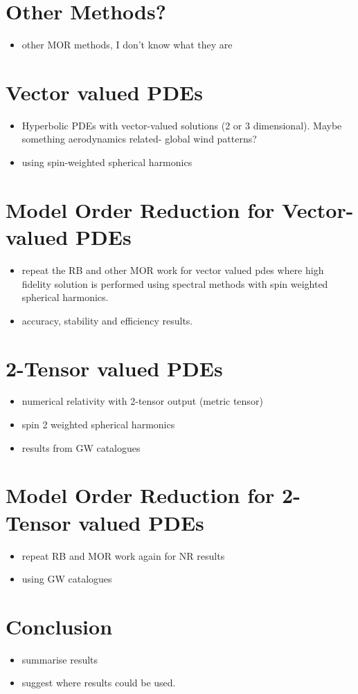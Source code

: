 \chapter{Other Methods?}
\begin{itemize}
\item other MOR methods, I don't know what they are
\end{itemize}

\chapter{Vector valued PDEs}
\begin{itemize}
\item Hyperbolic PDEs with vector-valued solutions (2 or 3 dimensional). Maybe something aerodynamics related- global wind patterns?
\item using spin-weighted spherical harmonics
\end{itemize}

\chapter{Model Order Reduction for Vector-valued PDEs}
\begin{itemize}
\item repeat the RB and other MOR work for vector valued pdes where high fidelity solution is performed using spectral methods with spin weighted spherical harmonics.
\item accuracy, stability and efficiency results.
\end{itemize}

\chapter{2-Tensor valued PDEs}
\begin{itemize}
\item numerical relativity with 2-tensor output (metric tensor)
\item spin 2 weighted spherical harmonics
\item results from GW catalogues
\end{itemize}

\chapter{Model Order Reduction for 2-Tensor valued PDEs}
\begin{itemize}
\item repeat RB and MOR work again for NR results
\item using GW catalogues
\end{itemize}

\chapter{Conclusion}
\begin{itemize}
\item summarise results
\item suggest where results could be used.
\end{itemize}



%
%

 